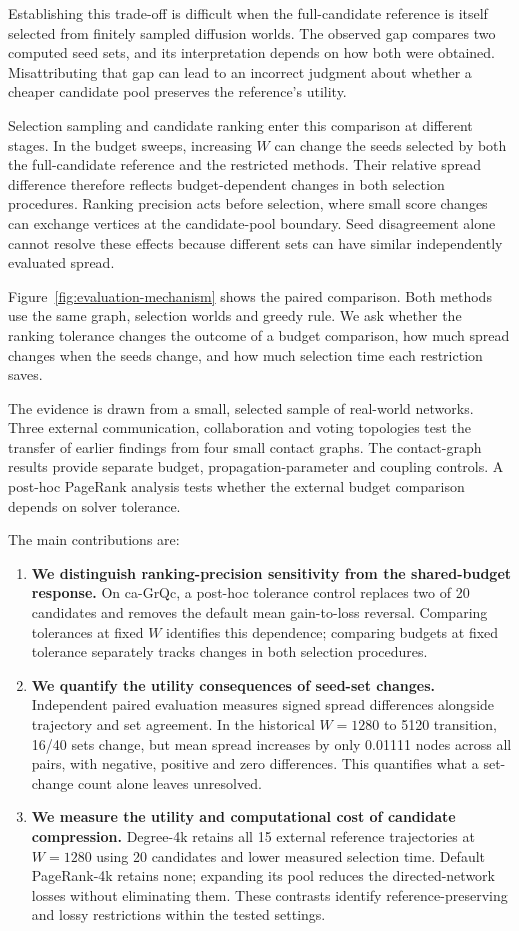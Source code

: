 \documentclass[smallextended]{svjour3}
\begin{document}
Establishing this trade-off is difficult when the full-candidate reference is itself selected from finitely sampled diffusion worlds. The observed gap compares two computed seed sets, and its interpretation depends on how both were obtained. Misattributing that gap can lead to an incorrect judgment about whether a cheaper candidate pool preserves the reference's utility.

Selection sampling and candidate ranking enter this comparison at different stages. In the budget sweeps, increasing $W$ can change the seeds selected by both the full-candidate reference and the restricted methods. Their relative spread difference therefore reflects budget-dependent changes in both selection procedures. Ranking precision acts before selection, where small score changes can exchange vertices at the candidate-pool boundary. Seed disagreement alone cannot resolve these effects because different sets can have similar independently evaluated spread.

Figure~\ref{fig:evaluation-mechanism} shows the paired comparison. Both methods use the same graph, selection worlds and greedy rule. We ask whether the ranking tolerance changes the outcome of a budget comparison, how much spread changes when the seeds change, and how much selection time each restriction saves.

The evidence is drawn from a small, selected sample of real-world networks. Three external communication, collaboration and voting topologies test the transfer of earlier findings from four small contact graphs. The contact-graph results provide separate budget, propagation-parameter and coupling controls. A post-hoc PageRank analysis tests whether the external budget comparison depends on solver tolerance.

The main contributions are:
\begin{enumerate}
\item[(1)] \textbf{We distinguish ranking-precision sensitivity from the shared-budget response.} On ca-GrQc, a post-hoc tolerance control replaces two of 20 candidates and removes the default mean gain-to-loss reversal. Comparing tolerances at fixed $W$ identifies this dependence; comparing budgets at fixed tolerance separately tracks changes in both selection procedures.
\item[(2)] \textbf{We quantify the utility consequences of seed-set changes.} Independent paired evaluation measures signed spread differences alongside trajectory and set agreement. In the historical $W=1280$ to 5120 transition, 16/40 sets change, but mean spread increases by only 0.01111 nodes across all pairs, with negative, positive and zero differences. This quantifies what a set-change count alone leaves unresolved.
\item[(3)] \textbf{We measure the utility and computational cost of candidate compression.} Degree-4k retains all 15 external reference trajectories at $W=1280$ using 20 candidates and lower measured selection time. Default PageRank-4k retains none; expanding its pool reduces the directed-network losses without eliminating them. These contrasts identify reference-preserving and lossy restrictions within the tested settings.
\end{enumerate}
\end{document}
